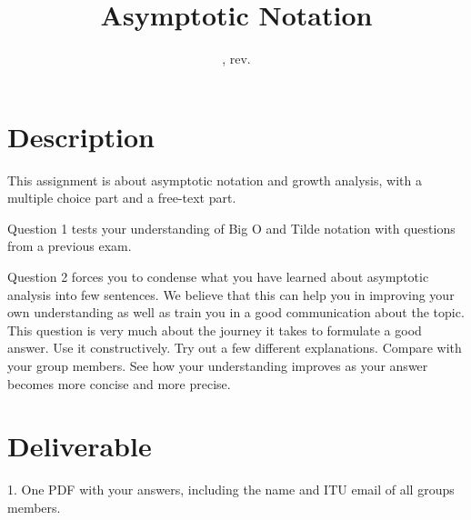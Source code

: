 \documentclass{tufte-handout}
\title{Asymptotic Notation}
\author{}
\date {\GITAuthorDate, rev. \GITAbrHash}
\begin{document}
\maketitle

\begin{abstract}
\end{abstract}

\section{\textbf{Description}}
  This assignment is about asymptotic notation and growth analysis, with a multiple choice part and a free-text part. 
  
  \medskip Question 1 tests your understanding of Big O and Tilde notation with questions from a previous exam.
  
  \medskip Question 2 forces you to condense what you have learned about asymptotic analysis into few sentences.
  We believe that this can help you in improving  your own understanding as well as train you in a good communication about the topic.
  This question is very much about the journey it takes to formulate a good answer.
  Use it constructively. Try out a few different explanations. Compare with your group members.
  See how your understanding improves as your answer becomes more concise and more precise.

\section{\textbf{Deliverable}}
1. One PDF with your answers, including the name and ITU email of all groups members.
\end{document}
